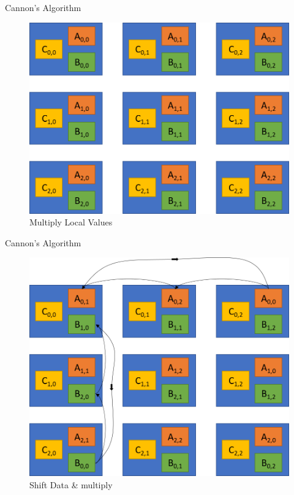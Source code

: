 \documentclass[10pt]{beamer}
\begin{document}
\begin{frame}{Cannon's Algorithm}
	\begin{figure}	
		\centering
		\includegraphics[width=0.72\linewidth]{figures/step_2_cannon.png}
		\caption{Multiply Local Values}
	\end{figure}
\end{frame}

\begin{frame}{Cannon's Algorithm}
	\begin{figure}	
		\centering
		\includegraphics[width=0.72\linewidth]{figures/step_3_cannon.png}
		\caption{Shift Data \& multiply}
	\end{figure}
\end{frame}

\end{document}
